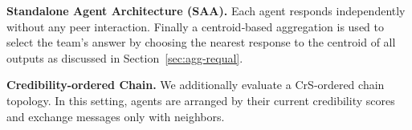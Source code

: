 \textbf{Standalone Agent Architecture (SAA).} Each agent responds independently without any peer interaction. Finally a centroid‑based aggregation \cite{requal} is used to select the team’s answer by choosing the nearest response to the centroid of all outputs as discussed in Section~\ref{sec:agg-requal}.

\textbf{Credibility-ordered Chain.} We additionally evaluate a CrS‑ordered chain topology. In this setting, agents are arranged by their current credibility scores and exchange messages only with neighbors.







